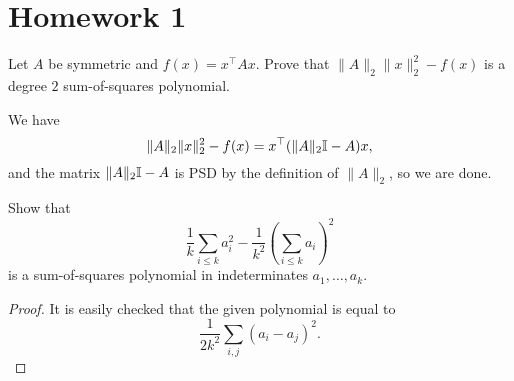 
\section{Homework 1}

\begin{exercise}
	Let $A$ be symmetric and $f(x) = x^\top A x$. Prove that $\|A\|_2 \|x\|_2^2 - f(x)$ is a degree $2$ sum-of-squares polynomial.
\end{exercise}
\begin{solution*}
	We have
	\[ \|A\|_2 \|x\|_2^2 - f(x) = x^\top ( \|A\|_2 \mathbb{I} - A  ) x, \]
	and the matrix $\|A\|_2 \mathbb{I} - A$ is PSD by the definition of $\|A\|_2$, so we are done.
\end{solution*}

\begin{exercise}
	Show that
	\[ \frac{1}{k} \sum_{i \le k} a_i^2 - \frac{1}{k^2} \left(\sum_{i \le k} a_i\right)^2 \]
	is a sum-of-squares polynomial in indeterminates $a_1,\ldots,a_k$.
\end{exercise}
\begin{proof}
	It is easily checked that the given polynomial is equal to
	\[ \frac{1}{2k^2} \sum_{i,j} (a_i - a_j)^2. \]
\end{proof}

